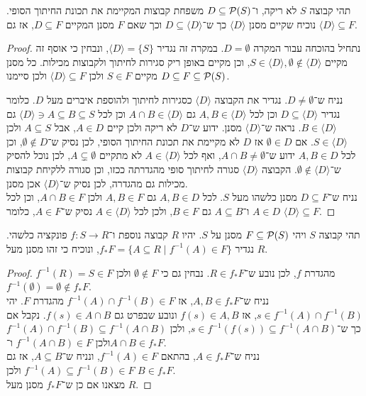 \question{}
תהי קבוצה $S$ לא ריקה, ו־$D \subseteq \mathcal{P}(S)$ משפחת קבוצות המקיימת את תכונת החיתוך הסופי.
נוכיח שקיים מסנן $\langle D \rangle$ כך ש־$D \subseteq \langle D \rangle$ וכך שאם $F$ מסנן המקיים $D \subseteq F$, אז גם $\langle D \rangle \subseteq F$.
\begin{proof}
	נתחיל בהוכחה עבור המקרה $D = \emptyset$.
	במקרה זה נגדיר $\langle D \rangle = \{ S \}$, ונבחין כי אוסף זה מקיים $S \in \langle D \rangle, \emptyset \notin \langle D \rangle$, וכן מקיים באופן ריק סגירות לחיתוך ולקבוצות מכילות.
	כל מסנן $D \subseteq F \subseteq \mathcal{P}(S)$ מקיים $S \in F$ ולכן $\langle D \rangle \subseteq F$ ולכן סיימנו.

	נניח ש־$D \ne \emptyset$.
	נגדיר את הקבוצה $\langle D \rangle$ כסגירות לחיתוך ולהוספת איברים מעל $D$.
	כלומר נגדיר $D \subseteq \langle D \rangle$ וכן לכל $A, B \in \langle D \rangle$ גם $A \cap B \in \langle D \rangle$ וכן לכל $\langle D \rangle \ni A \subseteq B \subseteq S$ גם $B \in \langle D \rangle$.
	נראה ש־$\langle D \rangle$ מסנן.
	ידוע ש־$D$ לא ריקה ולכן קיים $A \in D$, אבל $A \subseteq S$ ולכן $S \in \langle D \rangle$.
	אם $\emptyset \in D$ אז $D$ לא מקיימת את תכונת החיתוך הסופי, לכן נסיק ש־$\emptyset \notin D$, וכן לכל $A, B \in D$ ידוע ש־$A \cap B \ne \emptyset$, ואף לכל $A \in \langle D \rangle$ לא מתקיים $A \subsetneq \emptyset$,
	לכן נוכל להסיק ש־$\emptyset \notin \langle D \rangle$.
	הקבוצה $\langle D \rangle$ סגורה לחיתוך סופי מהגדרתה ככזו, וכן סגורה ללקיחת קבוצות מכילות גם מהגדרה, לכן נסיק ש־$\langle D \rangle$ אכן מסנן. \\
	נניח ש־$D \subseteq F$ מסנן כלשהו מעל $S$.
	לכל $A, B \in D$ גם $A, B \in F$ ולכן $A \cap B \in F$, וכן לכל $A \in D$ ו־$A \subseteq B$ גם $B \in F$, ולכן לכל $A \in \langle D \rangle$ נסיק ש־$A \in F$, כלומר $\langle D \rangle \subseteq F$.
\end{proof}

\question{}
תהי קבוצה $S$ ויהי $F \subseteq \mathcal{P}(S)$ מסנן על $S$.
יהיו $R$ קבוצה נוספת ו־$f : S \to R$ פונקציה כלשהי.
נגדיר $f_* F = \{ A \subseteq R \mid f^{-1}(A) \in F \}$, ונוכיח כי זהו מסנן מעל $R$.
\begin{proof}
	$f^{-1}(R) = S \in F$ מהגדרת $f$, לכן נובע ש־$R \in f_* F$.
	נבחין גם כי $\emptyset \notin F$ ולכן $f^{-1}(\emptyset) = \emptyset \notin f_* F$. \\
	נניח ש־$A, B \in f_* F$, אז $f^{-1}(A) \cap f^{-1}(B) \in F$ מהגדרת $F$.
	יהי $s \in f^{-1}(A) \cap f^{-1}(B)$, אז $f(s) \in A, B$ ונובע שבפרט גם $f(s) \in A \cap B$.
	נקבל אם כך ש־$s \in f^{-1}(f(s)) \subseteq f^{-1}(A \cap B)$, ולכן $f^{-1}(A) \cap f^{-1}(B) \subseteq f^{-1}(A \cap B)$ ולכן $f^{-1}(A \cap B) \in F$ ו־$A \cap B \in f_* F$. \\
	נניח ש־$A \in f_* F$, בהתאם $f^{-1}(A) \in F$, ונניח ש־$A \subseteq B$, אז גם $f^{-1}(A) \subseteq f^{-1}(B) \in F$ ולכן $B \in f_* F$. \\
	מצאנו אם כן ש־$f_* F$ מסנן מעל $R$.
\end{proof}



